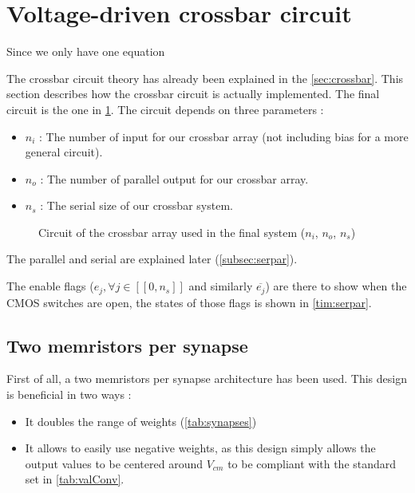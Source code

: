 \section{Voltage-driven crossbar circuit}
\label{sec:xbarCircuit}

Since we only have one equation

The crossbar circuit theory has already been explained in the \cref{sec:crossbar}. This section describes how the crossbar circuit is actually implemented. The final circuit is the one in \cref{circt:xbar}. The circuit depends on three parameters :
\begin{itemize}
  \item $n_i$ : The number of input for our crossbar array (not including bias for a more general circuit).
  \item $n_o$ : The number of parallel output for our crossbar array.
  \item $n_s$ : The serial size of our crossbar system.
\end{itemize}

\begin{figure}[H]
  \centering
  
  \caption{Circuit of the crossbar array used in the final system ($n_i$, $n_o$, $n_s$)}
  \label{circt:xbar}
\end{figure}

The parallel and serial are explained later (\cref{subsec:serpar}).

The enable flags ($e_j,\forall j\in[\![ 0,n_s]\!]$ and similarly $\overline{e_j}$) are there to show when the \ac{CMOS} switches are open, the states of those flags is shown in \cref{tim:serpar}.

\subsection{Two memristors per synapse}
\label{subsec:doubleMem}

First of all, a two memristors per synapse architecture has been used. This design is beneficial in two ways :

\begin{itemize}
  \item It doubles the range of weights (\cref{tab:synapses})
  \item It allows to easily use negative weights, as this design simply allows the output values to be centered around $V_{cm}$ to be compliant with the standard set in \cref{tab:valConv}.
\end{itemize}

